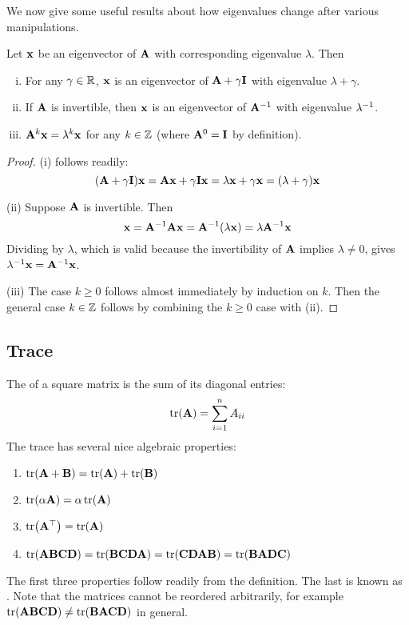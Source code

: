 We now give some useful results about how eigenvalues change after various manipulations.
\begin{proposition}
Let $\mathbf{x}$ be an eigenvector of $\mathbf{A}$ with corresponding eigenvalue $\lambda$.
Then
\begin{enumerate}[(i)]
\item For any $\gamma \in \mathbb{R}$, $\mathbf{x}$ is an eigenvector of $\mathbf{A} + \gamma\mathbf{I}$ with eigenvalue $\lambda + \gamma$.
\item If $\mathbf{A}$ is invertible, then $\mathbf{x}$ is an eigenvector of $\mathbf{A}^{-1}$ with eigenvalue $\lambda^{-1}$.
\item $\mathbf{A}^k\mathbf{x} = \lambda^k\mathbf{x}$ for any $k \in \mathbb{Z}$ (where $\mathbf{A}^0 = \mathbf{I}$ by definition).
\end{enumerate}
\end{proposition}
\begin{proof}
(i) follows readily:
\[(\mathbf{A} + \gamma\mathbf{I})\mathbf{x} = \mathbf{A}\mathbf{x} + \gamma\mathbf{I}\mathbf{x} = \lambda\mathbf{x} + \gamma\mathbf{x} = (\lambda + \gamma)\mathbf{x}\]

(ii) Suppose $\mathbf{A}$ is invertible. Then
\[\mathbf{x} = \mathbf{A}^{-1}\mathbf{A}\mathbf{x} = \mathbf{A}^{-1}(\lambda\mathbf{x}) = \lambda\mathbf{A}^{-1}\mathbf{x}\]
Dividing by $\lambda$, which is valid because the invertibility of $\mathbf{A}$ implies $\lambda \neq 0$, gives $\lambda^{-1}\mathbf{x} = \mathbf{A}^{-1}\mathbf{x}$.

(iii) The case $k \geq 0$ follows almost immediately by induction on $k$.
Then the general case $k \in \mathbb{Z}$ follows by combining the $k \geq 0$ case with (ii).
\end{proof}

\subsection{Trace}
The  of a square matrix is the sum of its diagonal entries:
\[\tr(\mathbf{A}) = \sum_{i=1}^n A_{ii}\]
The trace has several nice algebraic properties:
\begin{enumerate}
\item $\tr(\mathbf{A}+\mathbf{B}) = \tr(\mathbf{A}) + \tr(\mathbf{B})$
\item $\tr(\alpha \mathbf{A}) = \alpha\tr(\mathbf{A})$
\item $\tr(\mathbf{A}^\top) = \tr(\mathbf{A})$
\item $\tr(\mathbf{A}\mathbf{B}\mathbf{C}\mathbf{D}) = \tr(\mathbf{B}\mathbf{C}\mathbf{D}\mathbf{A}) = \tr(\mathbf{C}\mathbf{D}\mathbf{A}\mathbf{B}) = \tr(\mathbf{B}\mathbf{A}\mathbf{D}\mathbf{C})$
\end{enumerate}
The first three properties follow readily from the definition.
The last is known as . Note that the matrices cannot be reordered arbitrarily, for example $\tr(\mathbf{A}\mathbf{B}\mathbf{C}\mathbf{D}) \neq \tr(\mathbf{B}\mathbf{A}\mathbf{C}\mathbf{D})$ in general.

